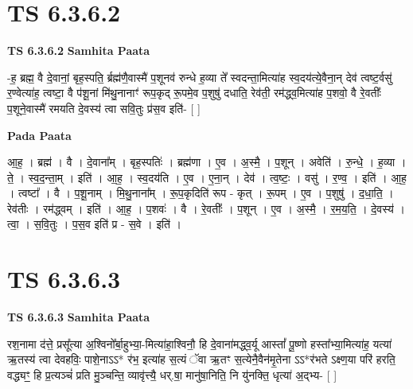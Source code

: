 \documentclass[17pt]{extarticle}
\begin{document}

\section{ TS 6.3.6.2 }

\textbf{TS 6.3.6.2 } \newline
\textbf{Samhita Paata} \newline

-ह॒ ब्रह्म॒ वै दे॒वानां॒ बृह॒स्पति॒ र्ब्रह्म॑णै॒वास्मै॑ प॒शूनव॑ रुन्धे ह॒व्या ते᳚ स्वदन्ता॒मित्या॑ह स्व॒दय॑त्ये॒वैना॒न् देव॑ त्वष्ट॒र्वसु॑ र॒ण्वेत्या॑ह॒ त्वष्टा॒ वै प॑शू॒नां मि॑थु॒नानाꣳ॑ रूप॒कृद् रू॒पमे॒व प॒शुषु॑ दधाति॒ रेव॑ती॒ रम॑द्ध्व॒मित्या॑ह प॒शवो॒ वै रे॒वतीः᳚ प॒शूने॒वास्मै॑ रमयति दे॒वस्य॑ त्वा सवि॒तुः प्र॑स॒व इति॑- [  ] \newline

\textbf{Pada Paata} \newline

आ॒ह॒ । ब्रह्म॑ । वै । दे॒वाना᳚म् । बृह॒स्पतिः॑ । ब्रह्म॑णा । ए॒व । अ॒स्मै॒ । प॒शून् । अवेति॑ । रु॒न्धे॒ । ह॒व्या । ते॒ । स्व॒द॒न्ता॒म् । इति॑ । आ॒ह॒ । स्व॒दय॑ति । ए॒व । ए॒ना॒न् । देव॑ । त्व॒ष्टः॒ । वसु॑ । र॒ण्व॒ । इति॑ । आ॒ह॒ । त्वष्टा᳚ । वै । प॒शू॒नाम् । मि॒थु॒नाना᳚म् । रू॒प॒कृदिति॑ रूप - कृत् । रू॒पम् । ए॒व । प॒शुषु॑ । द॒धा॒ति॒ । रेव॑तीः । रम॑द्ध्वम् । इति॑ । आ॒ह॒ । प॒शवः॑ । वै । रे॒वतीः᳚ । प॒शून् । ए॒व । अ॒स्मै॒ । र॒म॒य॒ति॒ । दे॒वस्य॑ । त्वा॒ । स॒वि॒तुः । प॒स॒व इति॑ प्र - स॒वे । इति॑ ।  \newline





\section{ TS 6.3.6.3 }

\textbf{TS 6.3.6.3 } \newline
\textbf{Samhita Paata} \newline

रश॒नामा द॑त्ते॒ प्रसू᳚त्या अ॒श्विनो᳚र्बा॒हुभ्या॒-मित्या॑हा॒श्विनौ॒ हि दे॒वाना॑मद्ध्व॒र्यू आस्तां᳚ पू॒ष्णो हस्ता᳚भ्या॒मित्या॑ह॒ यत्या॑ ऋ॒तस्य॑ त्वा देवहविः॒ पाशे॒नाऽऽ* र॑भ॒ इत्या॑ह स॒त्यं ॅवा ऋ॒तꣳ स॒त्येनै॒वैन॑मृ॒तेना ऽऽ*र॑भते ऽक्ष्ण॒या परि॑ हरति॒ वद्ध्यꣳ॒॒ हि प्र॒त्यञ्चं॑ प्रति मु॒ञ्चन्ति॒ व्यावृ॑त्त्यै॒ धर्.षा॒ मानु॑षा॒निति॒ नि यु॑नक्ति॒ धृत्या॑ अ॒द्भ्य- [  ] \newline
\end{document}
